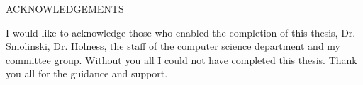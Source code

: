\begin{center}

\begin{bfseries}

ACKNOWLEDGEMENTS\\

\end{bfseries}

\end{center}


\begin{flushleft}
\doublespacing
I would like to acknowledge those who enabled the completion of this thesis,
Dr. Smolinski, Dr. Holness, the staff of the computer science department
and my committee group. Without you all I could not have completed this thesis.
Thank you all for the guidance and support.\\
\singlespacing
\end{flushleft}


\pagebreak
